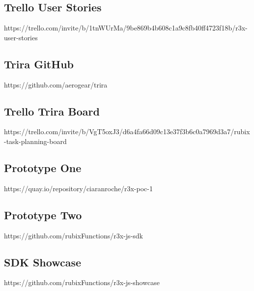 \documentclass{article}
\begin{document}
\subsection{Trello User Stories}
\label{appendix:trellouser}
https://trello.com/invite/b/1tnWUrMa/9be869b4b608c1a9c8fb40ff4723f18b/r3x-user-stories

\subsection{Trira GitHub}
\label{appendix:triragithub}
https://github.com/aerogear/trira

\subsection{Trello Trira Board}
\label{appendix:trellotrira}
https://trello.com/invite/b/VgT5oxJ3/d6a4fa66d09c13e37f3b6c0a7969d3a7/rubix-task-planning-board

\subsection{Prototype One}
\label{appendix:proto1}
https://quay.io/repository/ciaranroche/r3x-poc-1

\subsection{Prototype Two}
\label{appendix:proto2}
https://github.com/rubixFunctions/r3x-js-sdk

\subsection{SDK Showcase}
\label{appendix:sdkshowcase}
https://github.com/rubixFunctions/r3x-js-showcase





\newpage

\end{document}
